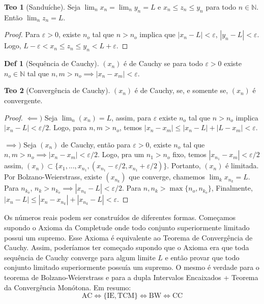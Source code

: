 \documentclass[journal, letterpaper]{IEEEtran}
\theoremstyle{definition}
\newtheorem{definition}{Def}[section]
\newtheorem{theorem}{Teo}
\begin{document}
\begin{theorem}[Sanduíche]
	Seja $\lim_n x_n = \lim_n y_n = L$ e $x_n \leq z_n \leq y_n$ para todo $n \in \mathbb N$. Então
	$\lim_n z_n = L$.
\end{theorem}
\begin{proof}
	Para $\varepsilon > 0$, existe $n_o$ tal que $n>n_o$ implica que
	$|x_n - L| < \varepsilon$,
	$|y_n - L| < \varepsilon$. Logo, $L - \varepsilon < x_n \leq z_n \leq y_n < L + \varepsilon$.
\end{proof}

\begin{definition}[Sequência de Cauchy]
	$(x_n)$ é de Cauchy se para todo $\varepsilon >0$ existe $n_o \in \mathbb N$ tal que
	$n,m > n_o \implies |x_n - x_m|<\varepsilon$.
\end{definition}
\begin{theorem}[Convergência de Cauchy]
	$(x_n)$ é de Cauchy, se, e somente se, $(x_n)$ é convergente.
\end{theorem}
\begin{proof}
	$\impliedby)$ Seja $\lim_n (x_n) = L$, assim, para $\varepsilon$ existe $n_o$ tal que $n> n_o$ implica
	$|x_n - L| < \varepsilon/2$. Logo, para $n,m > n_o$, temos $|x_n - x_m| \leq |x_n - L| + |L - x_m| < \varepsilon$.

	$\implies)$ Seja $(x_n)$ de Cauchy, então para $\varepsilon > 0$, existe $n_o$ tal que
	$n,m > n_o \implies |x_n - x_m| < \varepsilon/2$. Logo, pra um $n_1>n_o$ fixo, temos $|x_{n_1} - x_m| < \varepsilon/2$
	assim, $(x_n) \subset \{x_1,...,x_{n_1}, (x_{n_1}-\varepsilon/2,x_{n_1}+\varepsilon/2)\}$. Portanto, $(x_n)$ é limitada.
	Por Bolzano-Weierstrass, existe $(x_{n_k})$ que converge, chamemos $\lim_k x_{n_k} = L$.
	Para $n_{k_o}$, $n_k > n_{k_o} \implies |x_{n_k} - L| < \varepsilon/2$.
	Para $n,n_k >\max \{n_o, n_{k_o}\}$,
	Finalmente,$|x_n - L| \leq |x_n - x_{n_k}| + |x_{n_k} - L| < \varepsilon$.
\end{proof}

Os números reais podem ser construídos de diferentes formas. Começamos supondo o Axioma da Completude
onde todo conjunto superiormente limitado possui um supremo. Esse Axioma é equivalente ao Teorema de 
Convergência de Cauchy. Assim, poderíamos ter começado supondo que o Axioma era que toda sequência de Cauchy converge
para algum limite $L$ e então provar que todo conjunto limitado superiormente possuía um supremo.
O mesmo é verdade para o teorema de Bolzano-Weierstrass e para a dupla Intervalos Encaixados + Teorema da
Convergência Monótona. Em resumo:
\begin{equation*}
	\mathrm{AC} \iff \{\mathrm {IE, TCM}\} \iff \mathrm{BW} \iff \mathrm{CC}
\end{equation*}
\end{document}
